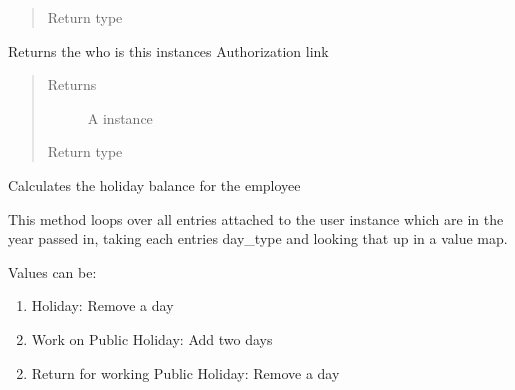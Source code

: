 \documentclass[letterpaper,10pt,english]{sphinxmanual}
\begin{document}
\begin{fulllineitems}
\begin{fulllineitems}
\begin{quote}
\begin{description}
\item[{Return type}] \leavevmode
{}

\end{description}\end{quote}

\end{fulllineitems}


\begin{fulllineitems}
\label{code:timetracker.tracker.models.Tbluser.get_administrator}
Returns the {\hyperref[code:timetracker.tracker.models.Tbluser]{}} who is this instances Authorization link
\begin{quote}\begin{description}
\item[{Returns}] \leavevmode
A {\hyperref[code:timetracker.tracker.models.Tbluser]{}} instance

\item[{Return type}] \leavevmode
{\hyperref[code:timetracker.tracker.models.Tbluser]{}}

\end{description}\end{quote}

\end{fulllineitems}


\begin{fulllineitems}
\label{code:timetracker.tracker.models.Tbluser.get_holiday_balance}
Calculates the holiday balance for the employee

This method loops over all {\hyperref[code:timetracker.tracker.models.TrackingEntry]{}} entries attached to
the user instance which are in the year passed in, taking each entries
day\_type and looking that up in a value map.

Values can be:
\begin{enumerate}
\item {} 
Holiday: Remove a day

\item {} 
Work on Public Holiday: Add two days

\end{enumerate}
\begin{enumerate}
\setcounter{enumi}{1}
\item {} 
Return for working Public Holiday: Remove a day


\end{enumerate}
\end{fulllineitems}
\end{fulllineitems}
\end{document}
